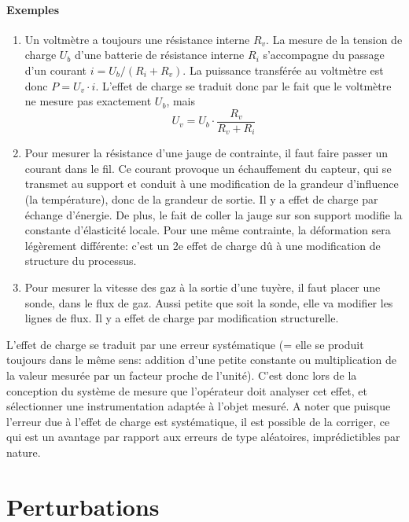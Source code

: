 \paragraph{Exemples}

\begin{enumerate}
\item Un voltmètre a toujours une résistance interne $R_v$. La mesure de la tension de charge $U_b$ d'une batterie de résistance interne $R_i$ s'accompagne du passage d'un courant $i = U_b/(R_i+R_v)$. La puissance transférée au voltmètre est donc $P=U_v\cdot i$. L'effet de charge se traduit donc par le fait que le voltmètre ne mesure pas exactement $U_b$, mais
\begin{equation}
U_v=U_b\cdot\frac{R_v}{R_v+R_i}
\end{equation}
\item Pour mesurer la résistance d'une jauge de contrainte, il faut faire passer un courant dans le fil. Ce courant provoque un échauffement du capteur, qui se transmet au support et conduit à une modification de la grandeur d'influence (la température), donc de la grandeur de sortie. Il y a  effet de charge par échange d'énergie. De plus, le fait de coller la jauge sur son support modifie la constante d'élasticité locale. Pour une même contrainte, la déformation sera légèrement différente: c'est un 2e effet de charge dû à une modification de structure du processus.
\item Pour mesurer la vitesse des gaz à la sortie d'une tuyère, il faut placer une sonde, dans le flux de gaz. Aussi petite que soit la sonde, elle va modifier les lignes de flux. Il y a effet de charge par modification structurelle.
\end{enumerate}

L'effet de charge se traduit par une erreur systématique (= elle se produit toujours dans le même sens: addition d'une petite constante ou multiplication de la valeur mesurée par un facteur proche de l'unité). C'est donc lors de la conception du système de mesure que l'opérateur doit analyser cet effet, et sélectionner une instrumentation adaptée à l'objet mesuré. A noter que puisque l'erreur due à l'effet de charge est systématique, il est possible de la corriger, ce qui est un avantage par rapport aux erreurs de type aléatoires, imprédictibles par nature.

\newpage

\section{Perturbations}

